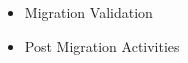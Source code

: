 \begin{itemize}
\begin{itemize}
		\item Migration Validation
		
		\item Post Migration Activities
		
	\end{itemize}
\end{itemize}